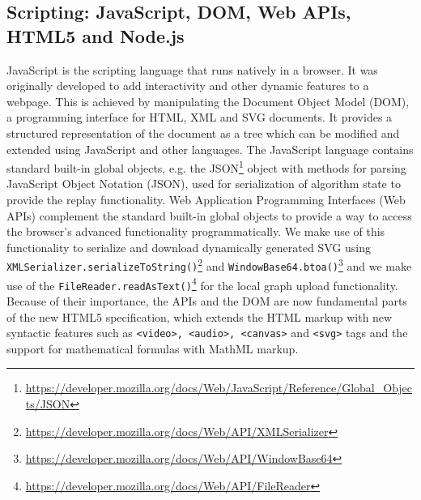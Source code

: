 \subsection{Scripting: JavaScript, DOM, Web APIs, HTML5 and Node.js}\label{sec:script}
JavaScript is the scripting language that runs natively in a browser. It was originally developed to  add interactivity and other dynamic features to a webpage. This is achieved by manipulating the Document Object Model (DOM), a programming interface for HTML, XML and SVG documents. It provides a structured representation of the document as a tree which can be modified and extended using JavaScript and other languages. The JavaScript language contains standard built-in global objects, e.g. the JSON\footnote{\url{https://developer.mozilla.org/docs/Web/JavaScript/Reference/Global_Objects/JSON}} object with methods for parsing JavaScript Object Notation (JSON), used for serialization of algorithm state to provide the replay functionality. Web Application Programming Interfaces (Web APIs) complement the standard built-in global objects to provide a way to access the browser's advanced functionality programmatically. We make use of this functionality to serialize and download dynamically generated SVG using \texttt{XMLSerializer.serializeToString()}\footnote{\url{https://developer.mozilla.org/docs/Web/API/XMLSerializer}} and \texttt{WindowBase64.btoa()}\footnote{\url{https://developer.mozilla.org/docs/Web/API/WindowBase64}} and we make use of the \texttt{FileReader.readAsText()}\footnote{\url{https://developer.mozilla.org/docs/Web/API/FileReader}} for the local graph upload functionality. Because of their importance, the APIs and the DOM are now fundamental parts of the new HTML5 specification, which extends the HTML markup with new syntactic features such as \texttt{<video>, <audio>, <canvas>} and \texttt{<svg>} tags and the support for mathematical formulas with MathML markup.

